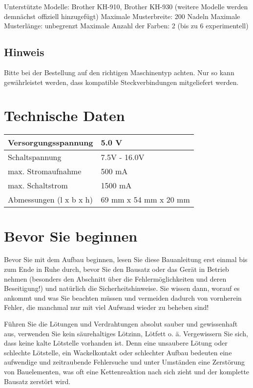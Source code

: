 \documentclass[fleqn,10pt]{SelfArx} %
\begin{document}
Unterstützte Modelle: Brother KH-910, Brother KH-930 (weitere Modelle werden demnächst offiziell hinzugefügt)
Maximale Musterbreite: 200 Nadeln
Maximale Musterlänge: unbegrenzt
Maximale Anzahl der Farben: 2 (bis zu 6 experimentell)

 \subsection*{Hinweis}

Bitte bei der Bestellung auf den richtigen Maschinentyp achten. Nur so kann gewährleistet werden, dass kompatible Steckverbindungen mitgeliefert werden.


\section{Technische Daten}

\begin{tabular}{ll}
Versorgungsspannung       & 5.0 V              \\ \hline
Schaltspannung            & 7.5V - 16.0V       \\ \hline
max. Stromaufnahme        & 500 mA             \\ \hline
max. Schaltstrom          & 1500 mA            \\ \hline
Abmessungen (l x b x h)   & 69 mm x 54 mm x 20 mm
\end{tabular}



\section{Bevor Sie beginnen}

Bevor Sie mit dem Aufbau beginnen, lesen Sie diese Bauanleitung erst einmal bis zum Ende in Ruhe durch, bevor Sie den Bausatz oder das Gerät in Betrieb nehmen (besonders den Abschnitt über die Fehlermöglichkeiten und deren Beseitigung!) und natürlich die Sicherheitshinweise. Sie wissen dann, worauf es ankommt und was Sie beachten müssen und vermeiden dadurch von vornherein Fehler, die manchmal nur mit viel Aufwand wieder zu beheben sind!

Führen Sie die Lötungen und Verdrahtungen absolut sauber und gewissenhaft aus, verwenden Sie kein säurehaltiges Lötzinn, Lötfett o. ä. Vergewissern Sie sich, dass keine kalte Lötstelle vorhanden ist. Denn eine unsaubere Lötung oder schlechte Lötstelle, ein Wackelkontakt oder schlechter Aufbau bedeuten eine aufwendige und zeitraubende Fehlersuche und unter Umständen eine Zerstörung von Bauelementen, was oft eine Kettenreaktion nach sich zieht und der komplette Bausatz zerstört wird.
\end{document}
